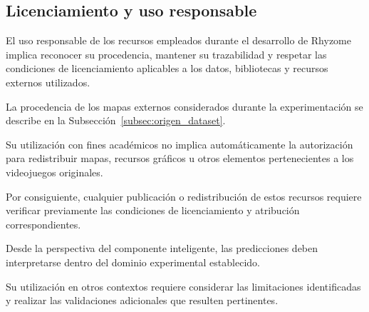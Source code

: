 
\subsection{Licenciamiento y uso responsable}
\label{subsec:licenciamiento_uso_responsable}

El uso responsable de los recursos empleados durante el desarrollo de Rhyzome implica reconocer su procedencia, mantener su trazabilidad y respetar las condiciones de licenciamiento aplicables a los datos, bibliotecas y recursos externos utilizados.

La procedencia de los mapas externos considerados durante la experimentación se describe en la Subsección~\ref{subsec:origen_dataset}.

Su utilización con fines académicos no implica automáticamente la autorización para redistribuir mapas, recursos gráficos u otros elementos pertenecientes a los videojuegos originales.

Por consiguiente, cualquier publicación o redistribución de estos recursos requiere verificar previamente las condiciones de licenciamiento y atribución correspondientes.

Desde la perspectiva del componente inteligente, las predicciones deben interpretarse dentro del dominio experimental establecido.

Su utilización en otros contextos requiere considerar las limitaciones identificadas y realizar las validaciones adicionales que resulten pertinentes.

\FloatBarrier